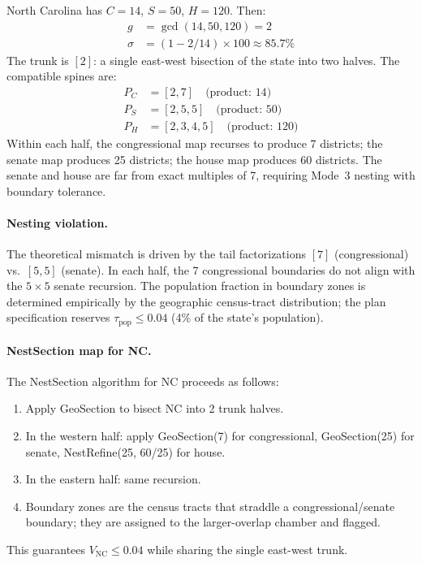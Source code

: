 North Carolina has $C = 14$, $S = 50$, $H = 120$.  Then:
\begin{align*}
  g &= \gcd(14, 50, 120) = 2 \\
  \sigma &= (1 - 2/14) \times 100 \approx 85.7\%
\end{align*}
The trunk is $[2]$: a single east-west bisection of the state into two halves.
The compatible spines are:
\begin{align*}
  P_C &= [2, 7] \quad \text{(product: }14\text{)} \\
  P_S &= [2, 5, 5] \quad \text{(product: }50\text{)} \\
  P_H &= [2, 3, 4, 5] \quad \text{(product: }120\text{)}
\end{align*}
Within each half, the congressional map recurses to produce 7 districts; the
senate map produces 25 districts; the house map produces 60 districts.  The
senate and house are far from exact multiples of 7, requiring Mode~3 nesting
with boundary tolerance.

\paragraph{Nesting violation.}  The theoretical mismatch is driven by the tail
factorizations $[7]$ (congressional) vs.\ $[5,5]$ (senate).  In each half,
the 7 congressional boundaries do not align with the $5 \times 5$ senate
recursion.  The population fraction in boundary zones is determined empirically
by the geographic census-tract distribution; the plan specification reserves
$\tau_\text{pop} \leq 0.04$ (4\% of the state's population).

\paragraph{NestSection map for NC.}
The NestSection algorithm for NC proceeds as follows:
\begin{enumerate}
  \item Apply GeoSection to bisect NC into 2 trunk halves.
  \item In the western half: apply GeoSection(7) for congressional, GeoSection(25)
        for senate, NestRefine(25, 60/25) for house.
  \item In the eastern half: same recursion.
  \item Boundary zones are the census tracts that straddle a congressional/senate
        boundary; they are assigned to the larger-overlap chamber and flagged.
\end{enumerate}
This guarantees $V_\text{NC} \leq 0.04$ while sharing the single east-west trunk.

